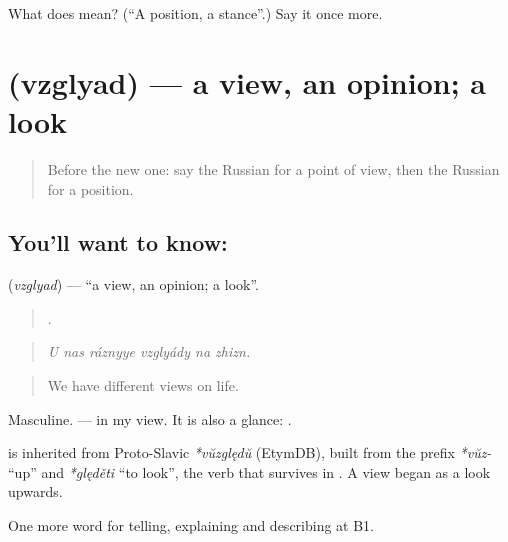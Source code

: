 \begin{tcolorbox}[breakable,colback=teal!4,colframe=teal!35!black,title={Before you move on}]
What does  mean? (\textquotedblleft{}A position, a stance\textquotedblright{}.) Say it once more.
\end{tcolorbox}
\section[\texorpdfstring{\ru{взгляд} (vzglyad)}{взгляд (vzglyad)}]{ (vzglyad) — a view, an opinion; a look}

\label{lesson:RU-C337-vzglyad}



\begin{quote}
Before the new one: say the Russian for a point of view, then the Russian for a position.
\end{quote}

\subsection*{You'll want to know: }
\textbf{} (\emph{vzglyad}) — \textquotedblleft{}a view, an opinion; a look\textquotedblright{}.

\begin{quote}
     .
\end{quote}

\begin{quote}
\emph{U nas ráznyye vzglyády na zhizn.}
\end{quote}

\begin{quote}
We have different views on life.
\end{quote}

Masculine. \emph{  } — in my view. It is also a glance: \emph{ }.

\begin{cousinweb}
\textbf{} is inherited from Proto-Slavic \emph{*vŭzględŭ} (EtymDB), built from the prefix \emph{*vŭz-} \textquotedblleft{}up\textquotedblright{} and \emph{*ględěti} \textquotedblleft{}to look\textquotedblright{}, the verb that survives in \emph{}. A view began as a look upwards.
\end{cousinweb}

\begin{grammarlens}[title={What you've built}]
One more word for telling, explaining and describing at B1.
\end{grammarlens}

